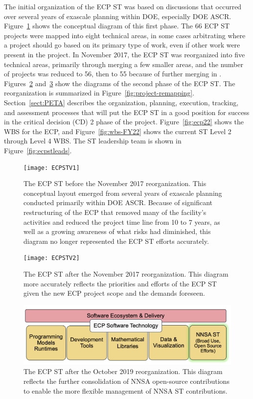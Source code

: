 The initial organization of the ECP ST was based on discussions that occurred over several years of exascale planning within DOE, especially DOE ASCR.  Figure~\ref{fig:ecpstv1} shows the conceptual diagram of this first phase.  The 66 ECP ST projects were mapped into eight technical areas, in some cases arbitrating where a project should go based on its primary type of work, even if other work were present in the project.  In November 2017, the ECP ST was reorganized into five technical areas, primarily through merging a few smaller areas, and the number of projects was reduced to 56, then to 55 because of further merging in \ecosystem.  Figures~\ref{fig:ecpstv2} and~\ref{fig:ecpstv3} show the diagrams of the second phase of the ECP ST. The reorganization is summarized in Figure~\ref{fig:project-remapping}. Section~\ref{sect:PETA} describes the organization, planning, execution, tracking, and assessment processes that will put the ECP ST in a good position for success in the critical decision (CD) 2 phase of the project.  Figure~\ref{fig:ecp22} shows the WBS for the ECP, and Figure~\ref{fig:wbs-FY22} shows the current ST Level 2 through Level 4 WBS. The ST leadership team is shown in Figure~\ref{fig:ecpstleads}.


\begin{figure}
	\centering
	\texttt{[image: ECPSTV1]}
	\caption{The ECP ST before the November 2017 reorganization.  This conceptual layout emerged from several years of exascale planning conducted primarily within DOE ASCR.  Because of significant restructuring of the ECP that removed many of the facility's activities and reduced the project time line from 10 to 7 years, as well as a growing awareness of what risks had diminished, this diagram no longer represented the ECP ST efforts accurately.}
	\label{fig:ecpstv1}
\end{figure}
\begin{figure}
	\centering
	\texttt{[image: ECPSTV2]}
	\caption{The ECP ST after the November 2017 reorganization.  This diagram more accurately reflects the priorities and efforts of the ECP ST given the new ECP project scope and the demands foreseen.}
	\label{fig:ecpstv2}
\end{figure}
\begin{figure}
	\centering
	\includegraphics[width=1.0\linewidth]{ECPSTV3}
	\caption{The ECP ST after the October 2019 reorganization.  This diagram reflects the further consolidation of NNSA open-source contributions to enable the more flexible management of NNSA ST contributions.}
	\label{fig:ecpstv3}
\end{figure}

